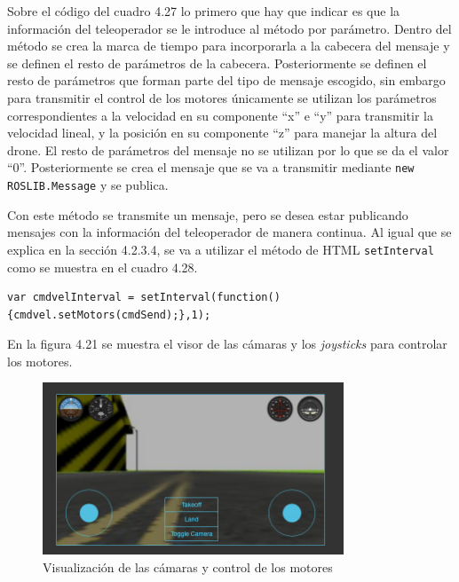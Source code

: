 Sobre el código del cuadro 4.27 lo primero que hay que indicar es que la información del teleoperador se le introduce al método por parámetro. Dentro del método se crea la marca de tiempo para incorporarla a la cabecera del mensaje y se definen el resto de parámetros de la cabecera. Posteriormente se definen el resto de parámetros que forman parte del tipo de mensaje escogido, sin embargo para transmitir el control de los motores únicamente se utilizan los parámetros correspondientes a la velocidad en su componente ``x'' e ``y'' para transmitir la velocidad lineal, y la posición en su componente ``z'' para manejar la altura del drone. El resto de parámetros del mensaje no se utilizan por lo que se da el valor ``0''. Posteriormente se crea el mensaje que se va a transmitir mediante \texttt{new ROSLIB.Message} y se publica.

Con este método se transmite un mensaje, pero se desea estar publicando mensajes con la información del teleoperador de manera continua. Al igual que se explica en la sección 4.2.3.4, se va a utilizar el método de HTML \texttt{setInterval} como se muestra en el cuadro 4.28.

\begin{lstlisting}[caption= Publicación continua del mensaje con la información del teleoperador, label=cod.intervalMotors]
var cmdvelInterval = setInterval(function(){cmdvel.setMotors(cmdSend);},1);
\end{lstlisting}

En la figura 4.21 se muestra el visor de las cámaras y los \textit{joysticks} para controlar los motores.

\begin{figure}[H]
  \begin{center}
    \includegraphics[width=0.8\textwidth]{figures/camaradrone.png}
		\caption{Visualización de las cámaras y control de los motores}
		\label{fig.camaradrone}
		\end{center}
\end{figure}

